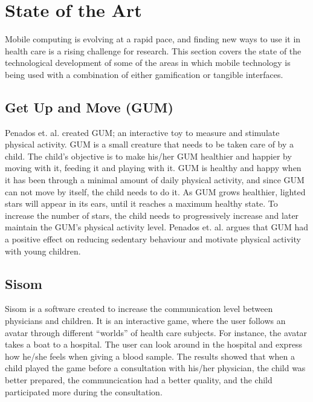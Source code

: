 \section{State of the Art}
\label{sec:stateoftheart}
Mobile computing is evolving at a rapid pace, and finding new ways to use it in health care is a rising challenge for research. This section covers the state of the technological development of some of the areas in which mobile technology is being used with a combination of either gamification or tangible interfaces.   


\subsection{Get Up and Move (GUM)}
\label{sec:gum}
Penados et. al.\cite{penadosget} created GUM; an interactive toy to measure and stimulate physical activity. GUM is a small creature that needs to be taken care of by a child. The child's objective is to make his/her GUM healthier and happier by moving with it, feeding it and playing with it. GUM is healthy and happy when it has been through a minimal amount of daily physical activity, and since GUM can not move by itself, the child needs to do it. As GUM grows healthier, lighted stars will appear in its ears, until it reaches a maximum healthy state. To increase the number of stars, the child needs to progressively increase and later maintain the GUM's physical activity level. Penados et. al. argues that GUM had a positive effect on reducing sedentary behaviour and motivate physical activity with young children.


\subsection{Sisom}
\label{sec:sisom}
Sisom is a software created to increase the communication level between physicians and children. It is an interactive game, where the user follows an avatar through different ``worlds'' of health care subjects. For instance, the avatar takes a boat to a hospital. The user can look around in the hospital and express how he/she feels when giving a blood sample. The results showed that when a child played the game before a consultation with his/her physician, the child was better prepared, the communcication had a better quality, and the child participated more during the consultation\cite{sisom-research}.


